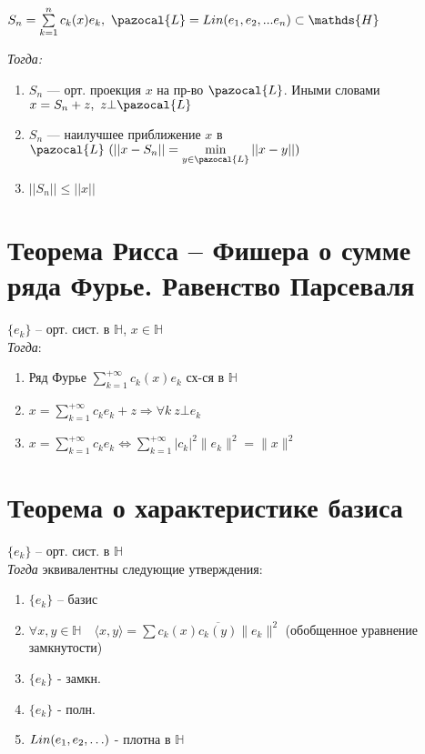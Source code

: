 \documentclass[paper=a4, fontsize=17pt]{article}
\begin{document}
$S_n = \sum\limits_{k=1}^{n} c_k(x)e_k,\ \pazocal{L} = Lin(e_1, e_2, ...e_n) \subset \mathds{H}$

\emph{Тогда:}

\begin{enumerate}

	\item $S_n$ {{---}} орт. проекция $x$ на пр-во $\pazocal{L}$. Иными словами $x = S_n + z,\ z \bot \pazocal{L}$
	
	\item $S_n$ {{---}} наилучшее приближение $x$ в $\pazocal{L}\ (||x - S_n|| = \min\limits_{y \in \pazocal{L}} ||x - y||)$	

	\item $||S_n|| \leqslant ||x||$

\end{enumerate}

\section{Теорема Рисса -- Фишера о сумме ряда Фурье. Равенство Парсеваля}
$\{e_k\}$ -- орт. сист. в $\mathds{H}$, $x \in \mathds{H}$\\

\emph{Тогда}:
\begin{enumerate}
	\item Ряд Фурье $\sum\limits_{k=1}^{+\infty} c_k(x) e_k$ сх-ся в $\mathds{H}$
	\item $x =\sum\limits_{k=1}^{+\infty} c_k e_k + z \Rightarrow \forall k \ z \bot e_k$
	\item $x =\sum\limits_{k=1}^{+\infty} c_k e_k \Leftrightarrow \sum\limits_{k=1}^{+\infty} \vert c_k \vert^2 \|e_k\|^2=\|x\|^2$
\end{enumerate}

\section{Теорема о характеристике базиса}

$\{e_k\}$ -- орт. сист. в $\mathds{H}$\\

\emph{Тогда} эквивалентны следующие утверждения:
\begin{enumerate}
	\item $\{e_k\}$ -- базис
	\item $\forall x, y \in \mathds{H} \quad \langle x, y \rangle = \sum c_k(x)\overline{c_k(y)}\|e_k\|^2$ (обобщенное уравнение замкнутости)
	\item $\{e_k\}$ - замкн.
	\item $\{e_k\}$ - полн.
	\item $Lin(e_1, e_2, \mathellipsis)$ - плотна в $\mathds{H}$ 
\end{enumerate}
\end{document}
